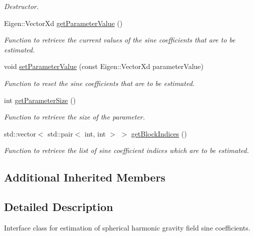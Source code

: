 \begin{DoxyCompactItemize}
\begin{DoxyCompactList}\small\item\em Destructor. \end{DoxyCompactList}\item 
Eigen\+::\+Vector\+Xd \hyperlink{classtudat_1_1estimatable__parameters_1_1SphericalHarmonicsSineCoefficients_a7f35c3406fdf98248ae2093dc10293e0}{get\+Parameter\+Value} ()
\begin{DoxyCompactList}\small\item\em Function to retrieve the current values of the sine coefficients that are to be estimated. \end{DoxyCompactList}\item 
void \hyperlink{classtudat_1_1estimatable__parameters_1_1SphericalHarmonicsSineCoefficients_addf046d353ecbacb2564945ef44e7a42}{set\+Parameter\+Value} (const Eigen\+::\+Vector\+Xd parameter\+Value)
\begin{DoxyCompactList}\small\item\em Function to reset the sine coefficients that are to be estimated. \end{DoxyCompactList}\item 
int \hyperlink{classtudat_1_1estimatable__parameters_1_1SphericalHarmonicsSineCoefficients_a6bc279795f8d3018b578a0bc519607d9}{get\+Parameter\+Size} ()
\begin{DoxyCompactList}\small\item\em Function to retrieve the size of the parameter. \end{DoxyCompactList}\item 
std\+::vector$<$ std\+::pair$<$ int, int $>$ $>$ \hyperlink{classtudat_1_1estimatable__parameters_1_1SphericalHarmonicsSineCoefficients_af6b7d8a7069f385739f47cdd3d2fb828}{get\+Block\+Indices} ()
\begin{DoxyCompactList}\small\item\em Function to retrieve the list of sine coefficient indices which are to be estimated. \end{DoxyCompactList}\end{DoxyCompactItemize}
\subsection*{Additional Inherited Members}


\subsection{Detailed Description}
Interface class for estimation of spherical harmonic gravity field sine coefficients. 

